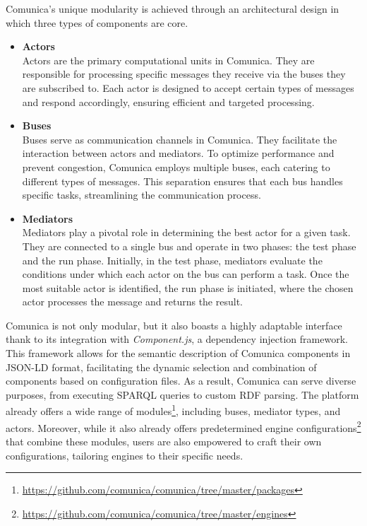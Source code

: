 Comunica's unique modularity is achieved through an architectural design in which three types of components are core.
\begin{itemize}
    \item \textbf{Actors}\\
    Actors are the primary computational units in Comunica. They are responsible for processing specific messages they receive via the buses they are subscribed to. Each actor is designed to accept certain types of messages and respond accordingly, ensuring efficient and targeted processing.

    \item \textbf{Buses}\\
    Buses serve as communication channels in Comunica. They facilitate the interaction between actors and mediators. To optimize performance and prevent congestion, Comunica employs multiple buses, each catering to different types of messages. This separation ensures that each bus handles specific tasks, streamlining the communication process.

    \item \textbf{Mediators}\\
    Mediators play a pivotal role in determining the best actor for a given task. They are connected to a single bus and operate in two phases: the test phase and the run phase. Initially, in the test phase, mediators evaluate the conditions under which each actor on the bus can perform a task. Once the most suitable actor is identified, the run phase is initiated, where the chosen actor processes the message and returns the result.
\end{itemize}
\citep{taelman2018comunica}

Comunica is not only modular, but it also boasts a highly adaptable interface thank to its integration with \textit{Component.js}, a dependency injection framework. This framework allows for the semantic description of Comunica components in JSON-LD format, facilitating the dynamic selection and combination of components based on configuration files. As a result, Comunica can serve diverse purposes, from executing SPARQL queries to custom RDF parsing. The platform already offers a wide range of modules\footnote{\url{https://github.com/comunica/comunica/tree/master/packages}}, including buses, mediator types, and actors. Moreover, while it also already offers predetermined engine configurations\footnote{\url{https://github.com/comunica/comunica/tree/master/engines}} that combine these modules, users are also empowered to craft their own configurations, tailoring engines to their specific needs. \citep{taelman2018comunica}

